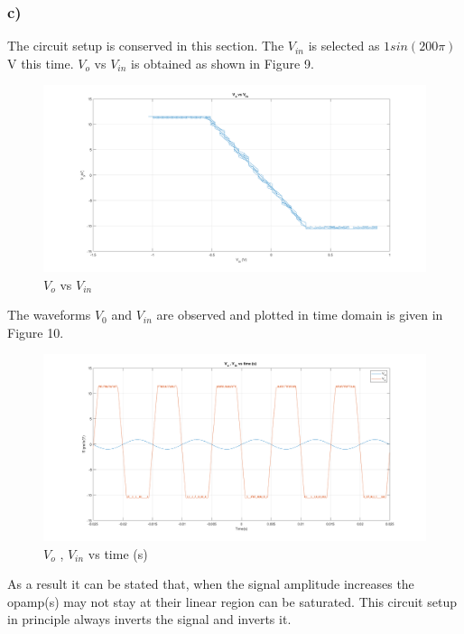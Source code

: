 \documentclass[letterpaper,12pt]{article}
\begin{document}
\subsubsection{c)}
The circuit setup is conserved in this section. The \(V_{in}\) is selected as \(1sin(200\pi)\) V this time. \(V_{o}\) vs \(V_{in}\) is obtained as shown in Figure 9.
\begin{figure}[H]
	\centering
   \includegraphics[width=1\textwidth]{1c_1.png}
   \caption{\(V_{o}\) vs \(V_{in}\)}
\end{figure}
The waveforms \(V_0\) and \(V_{in}\) are observed and plotted in time domain is given in Figure 10.
\begin{figure}[H]
	\centering
   \includegraphics[width=1\textwidth]{1c_2.png}
   \caption{\(V_{o}\) , \(V_{in}\) vs time (s) }
\end{figure}
As a result it can be stated that, when the signal amplitude increases the opamp(s) may not stay at their linear region can be saturated. This circuit setup in principle always inverts the signal and inverts it.
\end{document}
